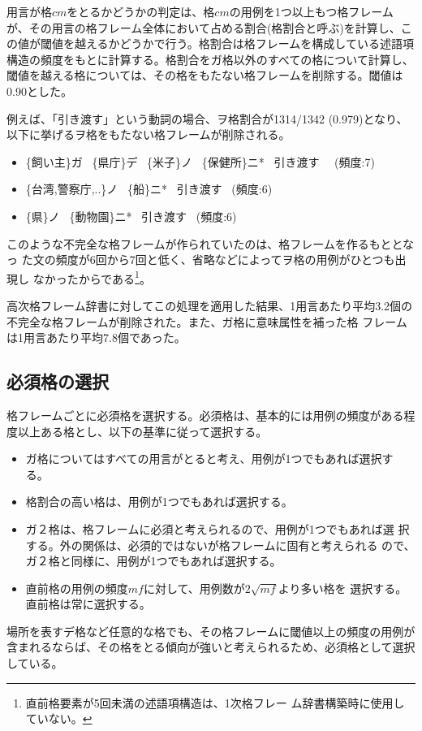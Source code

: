\documentclass[fleqn]{nlp}
\newcommand{\sm}[1]{}
\begin{document}
用言が格$cm$をとるかどうかの判定は、格$cm$の用例を1つ以上もつ格フレーム
が、その用言の格フレーム全体において占める割合(格割合と呼ぶ)を計算し、こ
の値が閾値を越えるかどうかで行う。格割合は格フレームを構成している述語項
構造の頻度をもとに計算する。格割合をガ格以外のすべての格について計算し、
閾値を越える格については、その格をもたない格フレームを削除する。閾値は
0.90とした。

例えば、「引き渡す」という動詞の場合、ヲ格割合が1314/1342 (0.979)となり、
以下に挙げるヲ格をもたない格フレームが削除される。
\begin{itemize}
 \item \{飼い主\}ガ \ \{県庁\}デ \ \{米子\}ノ \ \{保健所\}ニ* \ 引き渡す \ \ (頻度:7)
 \item \{台湾,警察庁,..\}ノ \ \{船\}ニ* \ 引き渡す \ (頻度:6)
 \item \{県\}ノ \ \{動物園\}ニ* \ 引き渡す \ (頻度:6)
\end{itemize}
このような不完全な格フレームが作られていたのは、格フレームを作るもととなっ
た文の頻度が6回から7回と低く、省略などによってヲ格の用例がひとつも出現し
なかったからである\footnote{直前格要素が5回未満の述語項構造は、1次格フレー
ム辞書構築時に使用していない。}。

高次格フレーム辞書に対してこの処理を適用した結果、1用言あたり平均3.2個の
不完全な格フレームが削除された。また、ガ格に意味属性\sm{主体}を補った格
フレームは1用言あたり平均7.8個であった。


\subsection{必須格の選択}

格フレームごとに必須格を選択する。必須格は、基本的には用例の頻度がある程
度以上ある格とし、以下の基準に従って選択する。
\begin{itemize}
 \item ガ格についてはすべての用言がとると考え、用例が1つでもあれば選択する。
 \item 格割合の高い格は、用例が1つでもあれば選択する。
 \item ガ２格は、格フレームに必須と考えられるので、用例が1つでもあれば選
       択する。外の関係は、必須的ではないが格フレームに固有と考えられる
       ので、ガ２格と同様に、用例が1つでもあれば選択する。
 \item 直前格の用例の頻度$mf$に対して、用例数が$2\sqrt{mf}$より多い格を
       選択する。直前格は常に選択する。
\end{itemize}
場所を表すデ格など任意的な格でも、その格フレームに閾値以上の頻度の用例が
含まれるならば、その格をとる傾向が強いと考えられるため、必須格として選択
している。
\end{document}
